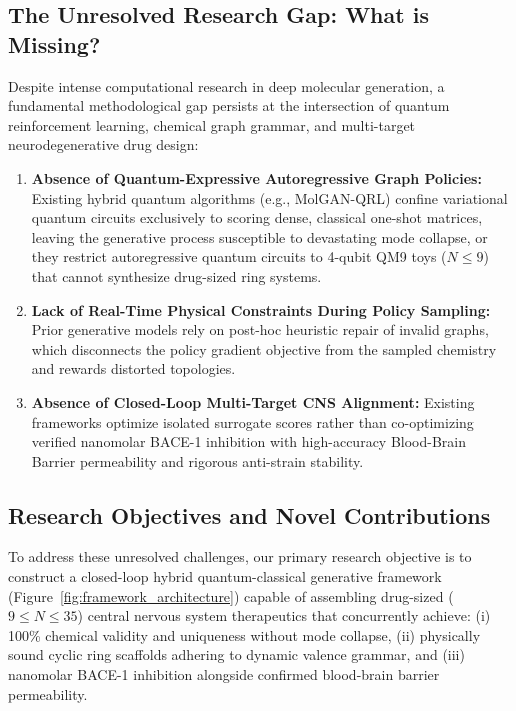 \documentclass[10pt,a4paper]{article}
\begin{document}
\subsection{The Unresolved Research Gap: What is Missing?}
Despite intense computational research in deep molecular generation, a fundamental methodological gap persists at the intersection of quantum reinforcement learning, chemical graph grammar, and multi-target neurodegenerative drug design:
\begin{enumerate}[noitemsep]
    \item \textbf{Absence of Quantum-Expressive Autoregressive Graph Policies:} Existing hybrid quantum algorithms (e.g., MolGAN-QRL) confine variational quantum circuits exclusively to scoring dense, classical one-shot matrices, leaving the generative process susceptible to devastating mode collapse, or they restrict autoregressive quantum circuits to 4-qubit QM9 toys ($N \le 9$) that cannot synthesize drug-sized ring systems.
    \item \textbf{Lack of Real-Time Physical Constraints During Policy Sampling:} Prior generative models rely on post-hoc heuristic repair of invalid graphs, which disconnects the policy gradient objective from the sampled chemistry and rewards distorted topologies.
    \item \textbf{Absence of Closed-Loop Multi-Target CNS Alignment:} Existing frameworks optimize isolated surrogate scores rather than co-optimizing verified nanomolar BACE-1 inhibition with high-accuracy Blood-Brain Barrier permeability and rigorous anti-strain stability.
\end{enumerate}

\subsection{Research Objectives and Novel Contributions}
To address these unresolved challenges, our primary research objective is to construct a closed-loop hybrid quantum-classical generative framework (Figure~\ref{fig:framework_architecture}) capable of assembling drug-sized ($9 \le N \le 35$) central nervous system therapeutics that concurrently achieve: (i) 100\% chemical validity and uniqueness without mode collapse, (ii) physically sound cyclic ring scaffolds adhering to dynamic valence grammar, and (iii) nanomolar BACE-1 inhibition alongside confirmed blood-brain barrier permeability. 
\end{document}

